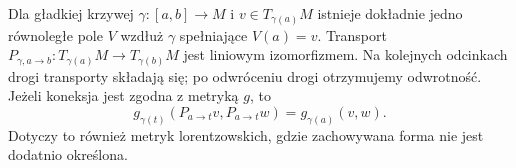 \begin{twierdzenie}
\label{thm:transport-rownolegly}
Dla gładkiej krzywej $\gamma:[a,b]\to M$
i $v\in T_{\gamma(a)}M$ istnieje dokładnie
jedno równoległe pole $V$ wzdłuż $\gamma$
spełniające $V(a)=v$. Transport
$P_{\gamma,a\to b}:T_{\gamma(a)}M\to T_{\gamma(b)}M$
jest liniowym izomorfizmem. Na kolejnych
odcinkach drogi transporty składają się;
po odwróceniu drogi otrzymujemy odwrotność.
Jeżeli koneksja jest zgodna z metryką $g$, to
\begin{equation}\label{eq:transport-izometria}
 g_{\gamma(t)}(P_{a\to t}v,P_{a\to t}w)
   =g_{\gamma(a)}(v,w).
\end{equation}
Dotyczy to również metryk lorentzowskich,
gdzie zachowywana forma nie jest dodatnio określona.
\end{twierdzenie}
